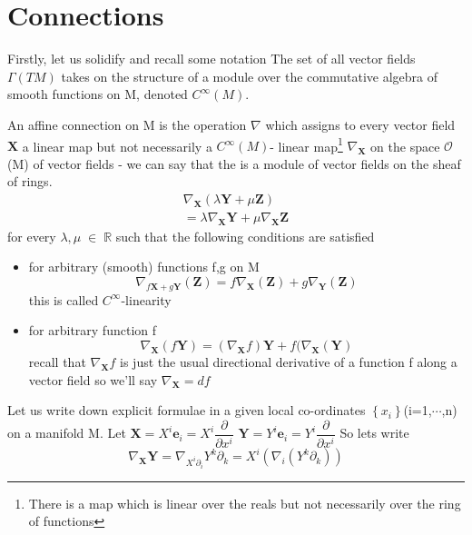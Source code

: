 
\section{Connections}
Firstly, let us solidify and recall some notation
The set of all vector fields $\Gamma(TM)$ takes on the structure of a module over the 
commutative algebra of smooth functions on M, denoted $C^{\infty}(M)$.
\begin{definition}
 An affine connection on M is the operation $\nabla$ which assigns to every vector field $\mathbf{X}$ a linear
 map but not necessarily a $C^{\infty}(M)$- linear map\footnote{There is a map which is linear over the reals but not necessarily
 over the ring of functions}
 $\nabla_{\mathbf{X}}$ on the space $\mathcal{O}$(M) of vector fields - we can say that the is a module of vector fields
 on the sheaf of rings. 
\begin{eqnarray}
 \nabla_{\mathbf{X}}(\lambda \mathbf{Y} + \mu \mathbf{Z}) \\
 = \lambda \nabla_{\mathbf{X}} \mathbf{Y} + \mu \nabla_{\mathbf{X}} \mathbf{Z}
\end{eqnarray}
for every $\lambda, \mu\;\in\;\mathbb{R}$
such that the following conditions are satisfied 
\begin{itemize}
 \item for arbitrary (smooth) functions f,g on M 
 \begin{equation}\label{2.4}
  \nabla_{f\mathbf{X} + g\mathbf{Y}}(\mathbf{Z}) = f \nabla_{\mathbf{X}}(\mathbf{Z}) 
  +g \nabla_{\mathbf{Y}}(\mathbf{Z})
 \end{equation}
this is called $C^{\infty}$-linearity
\item for arbitrary function f
\begin{equation}\label{2.5}
 \nabla_{\mathbf{X}}(f\mathbf{Y}) = (\nabla_{\mathbf{X}}f)\mathbf{Y} + f(\nabla_{\mathbf{X}}(\mathbf{Y})
\end{equation}
recall that $\nabla_{\mathbf{X}}f$ is just the usual directional derivative of a function f along a vector field
so we'll say $\nabla_{\mathbf{X}} = df$ 
\end{itemize}

\end{definition}
Let us write down explicit formulae in a given local co-ordinates $\left\lbrace x_i \right\rbrace$(i=1,$\cdots$,n)
on a manifold M. 
Let 
$\mathbf{X} = X^i\mathbf{e}_{i}= X^{i}\dfrac{\partial}{\partial x^{i}}$
$\mathbf{Y} = Y^i\mathbf{e}_{i} = Y^i \dfrac{\partial}{\partial x^i}$
So lets write 
\begin{equation}\label{2.6}
 \nabla_{\mathbf{X}}\mathbf{Y} = \nabla_{X^i\partial_i}Y^k\partial_k = X^{i}\left(\nabla_i\left(Y^k\partial_k\right)\right)
\end{equation}
